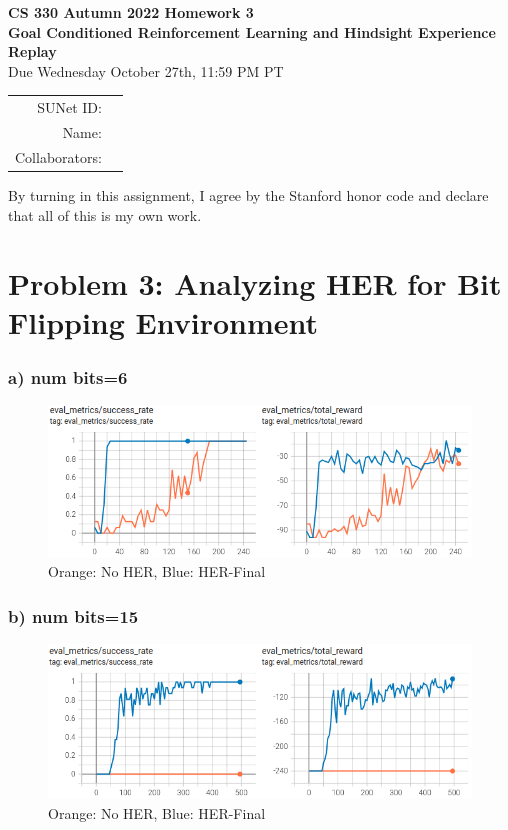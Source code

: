 \documentclass[12pt]{article}
\begin{document}
\begin{center}
{{\Large \textbf{CS 330 Autumn 2022 Homework 3 \\ Goal Conditioned Reinforcement Learning and Hindsight Experience Replay}}
\\ {\large Due Wednesday October 27th, 11:59 PM PT}}

\begin{tabular}{rl}
SUNet ID: &  \\
Name: & \\
Collaborators: & 
\end{tabular}
\end{center}

By turning in this assignment, I agree by the Stanford honor code and declare that all of this is my own work.

\newpage
\section*{Problem 3: Analyzing HER for Bit Flipping Environment}

\subsubsection*{a) num bits=6}

\begin{figure}[h!]
\centering
\includegraphics[width=1.0\linewidth]{figures/q3-a}
\vspace{-3mm}
\caption{Orange: No HER, Blue: HER-Final}
\label{fig:q3a}
\end{figure}


\subsubsection*{b) num bits=15}

\begin{figure}[h!]
\centering
\includegraphics[width=1.0\linewidth]{figures/q3-b}
\vspace{-3mm}
\caption{Orange: No HER, Blue: HER-Final}
\label{fig:q3b}
\end{figure}
\end{document}

